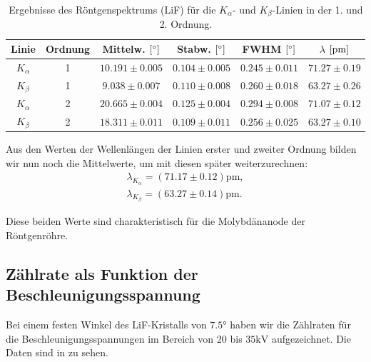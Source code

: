 \begin{table}[H]
  \centering
  \begin{tabular}{c|c|c|c|c||c}
    Linie & Ordnung & Mittelw. $\qty[\si{\degree}]$ & Stabw. $\qty[\si{\degree}]$ & FWHM $\qty[\si{\degree}]$ & $\lambda$ $\qty[\si{\pico\meter}]$\\\hline
    $K_{\alpha}$ & 1 & $10.191 \pm 0.005$ & $0.104 \pm 0.005$ & $0.245 \pm 0.011$ & $71.27 \pm 0.19$ \\
    $K_{\beta}$  & 1 & $9.038 \pm 0.007$  & $0.110 \pm 0.008$ & $0.260 \pm 0.018$ & $63.27 \pm 0.26$ \\\hline
    $K_{\alpha}$ & 2 & $20.665 \pm 0.004$ & $0.125 \pm 0.004$ & $0.294 \pm 0.008$ & $71.07 \pm 0.12$ \\
    $K_{\beta}$  & 2 & $18.311 \pm 0.011$ & $0.109 \pm 0.011$ & $0.256 \pm 0.025$ & $63.27 \pm 0.10$ \\\hline
  \end{tabular}
  \caption{Ergebnisse des Röntgenspektrums (LiF) für die $K_{\alpha}$- und $K_{\beta}$-Linien in der 1. und 2. Ordnung.}
  \label{tab:lif_k_alpha_beta}
\end{table}

Aus den Werten der Wellenlängen der Linien erster und zweiter Ordnung bilden wir nun noch die Mittelwerte, um mit diesen später weiterzurechnen:
\begin{align}
  \lambda_{K_{\alpha}} = (71.17 \pm 0.12)\si{\pico\meter},\label{res:wl_kalp}\\[1em]
  \lambda_{K_{\beta}} = (63.27 \pm 0.14)\si{\pico\meter}.\label{res:wl_kbet}
\end{align}

Diese beiden Werte sind charakteristisch für die Molybdänanode der Röntgenröhre.

\subsection{Zählrate als Funktion der Beschleunigungsspannung}

Bei einem festen Winkel des LiF-Kristalls von $7.5\si{\degree}$ haben wir die Zählraten für die Beschleunigungsspannungen im Bereich von $20$ bis $35\si{\kilo\volt}$ aufgezeichnet. Die Daten sind in  zu sehen.

